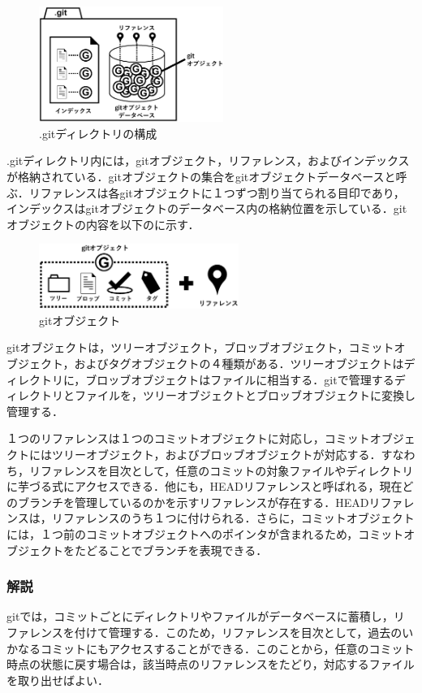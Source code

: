 \documentclass[a4j,9pt,twocolumn]{jsarticle}
\begin{document}
\begin{figure}[h]
\centering
\includegraphics[width=60mm]{img/git_obj.eps}
\caption{.gitディレクトリの構成}
\label{object1}
\end{figure}

.gitディレクトリ内には，gitオブジェクト，リファレンス，およびインデックスが格納されている．gitオブジェクトの集合をgitオブジェクトデータベースと呼ぶ．リファレンスは各gitオブジェクトに１つずつ割り当てられる目印であり，インデックスはgitオブジェクトのデータベース内の格納位置を示している．gitオブジェクトの内容を以下のに示す．

\begin{figure}[h]
\centering
\includegraphics[width=65mm]{img/git_obj2.eps}
\caption{gitオブジェクト}
\label{object2}
\end{figure}

gitオブジェクトは，ツリーオブジェクト，ブロッブオブジェクト，コミットオブジェクト，およびタグオブジェクトの４種類がある．ツリーオブジェクトはディレクトリに，ブロッブオブジェクトはファイルに相当する．gitで管理するディレクトリとファイルを，ツリーオブジェクトとブロッブオブジェクトに変換し管理する．

１つのリファレンスは１つのコミットオブジェクトに対応し，コミットオブジェクトにはツリーオブジェクト，およびブロッブオブジェクトが対応する．すなわち，リファレンスを目次として，任意のコミットの対象ファイルやディレクトリに芋づる式にアクセスできる．他にも，HEADリファレンスと呼ばれる，現在どのブランチを管理しているのかを示すリファレンスが存在する．HEADリファレンスは，リファレンスのうち１つに付けられる．さらに，コミットオブジェクトには，１つ前のコミットオブジェクトへのポインタが含まれるため，コミットオブジェクトをたどることでブランチを表現できる．

\subsubsection{解説}
gitでは，コミットごとにディレクトリやファイルがデータベースに蓄積し，リファレンスを付けて管理する．このため，リファレンスを目次として，過去のいかなるコミットにもアクセスすることができる．このことから，任意のコミット時点の状態に戻す場合は，該当時点のリファレンスをたどり，対応するファイルを取り出せばよい．
\end{document}
